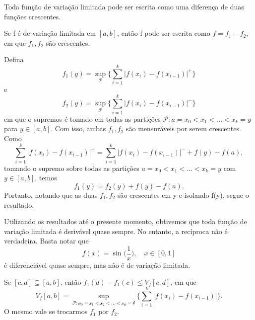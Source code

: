 \documentclass[measure_theory.tex]{subfiles}
\begin{document}
Toda função de variação limitada pode ser escrita como uma diferença de duas funções crescentes.
\begin{lemma*}
	Se f é de variação limitada em \([a, b]\), então f pode ser escrita como \(f= f_1 - f_2,\) em que \(f_1, f_2\) são crescentes.
\end{lemma*}
\begin{proof*}
	Defina
	\[
		f_1(y) = \sup_{\mathcal{P}}\biggl\{\sum\limits_{i=1}^{k}|f(x_{i})-f(x_{i-1})|^{+}\biggr\}
	\]
	e
	\[
		f_2(y) = \sup_{\mathcal{P}}\biggl\{\sum\limits_{i=1}^{k}|f(x_{i})-f(x_{i-1})|^{-}\biggr\}
	\]
	em que o supremos é tomado em todas as partições \(\mathcal{P}: a = x_{0} < x_1 < \dotsc < x_{k} = y\) para \(y\in [a, b].\) Com isso, ambas \(f_1, f_2\) são mensuráveis por serem crescentes.
	Como
	\[
		\sum\limits_{i=1}^{k}|f(x_{i}) - f(x_{i-1})|^{+} = \sum\limits_{i=1}^{k}|f(x_{i}) - f(x_{i-1})|^{-} + f(y) - f(a),
	\]
	tomando o supremo sobre todas as partições \(a=x_{0} < x_1 <\dotsc <x_{k} = y\) com \(y\in [a, b]\), temos
	\[
		f_1(y) = f_2(y) + f(y) - f(a).
	\]
	Portanto, notando que as duas \(f_1, f_2\) são crescentes em y e isolando f(y), segue o resultado. \qedsymbol
\end{proof*}
Utilizando os resultados até o presente momento, obtivemos que toda função de variação limitada é derivável quase sempre. No entanto, a recíproca não é verdadeira. Basta notar que
\[
	f(x) = \sin^{}{\biggl(\frac{1}{x}\biggr)},\quad x\in [0, 1]
\]
é diferenciável quase sempre, mas não é de variação limitada.
\begin{lemma*}
	Se \([c, d]\subseteq [a, b]\), então \(f_1(d) - f_1(c)\leq V_f[c, d]\), em que
	\[
		V_f[a, b] = \sup_{\mathcal{P:a_{0}=x_1 < x_2 < \dotsc <x_{k}=b}}\biggl\{\sum\limits_{i=1}^{k}|f(x_{i}) - f(x_{i-1})|\biggr\}.
	\]
	O mesmo vale se trocarmos \(f_1\) por \(f_2\).
\end{lemma*}
\end{document}
